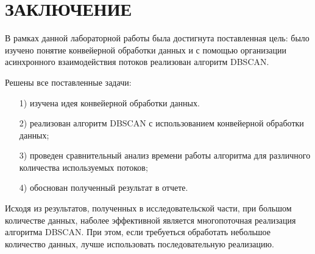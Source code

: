 {\centering \chapter*{ЗАКЛЮЧЕНИЕ}}

В рамках данной лабораторной работы была достигнута поставленная цель: было изучено понятие конвейерной обработки данных и с помощью организации асинхронного взаимодействия потоков реализован алгоритм DBSCAN.

Решены все поставленные задачи:
\begin{enumerate}
	\item[1)] изучена идея конвейерной обработки данных.
	\item[2)] реализован алгоритм DBSCAN с использованием конвейерной обработки данных;
	\item[3)] проведен сравнительный анализ времени работы алгоритма для различного количества используемых потоков;
	\item[4)] обоснован полученный результат в отчете.
\end{enumerate}

Исходя из результатов, полученных в исследовательской части, при большом количестве данных, наболее эффективной является многопоточная реализация алгоритма DBSCAN.
При этом, если требуеться обработать небольшое количество данных, лучше использовать последовательную реализацию.

